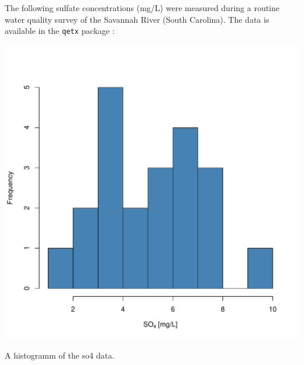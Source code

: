 \documentclass{tufte-book}\usepackage{knitr}
\begin{document}
The following sulfate concentrations (mg/L) were measured during a routine 
water quality survey of the Savannah River (South Carolina). 
The data is available in the \verb|qetx| package :

\begin{knitrout}
\color{fgcolor}\begin{kframe}
\begin{alltt}
\end{alltt}
\end{kframe}
\end{knitrout}



\begin{marginfigure}
\vspace{10mm}
\begin{knitrout}
\color{fgcolor}

{\centering \includegraphics[width=\linewidth]{graphics/so4_hist} 

}



\end{knitrout}

\caption{A histogramm of the so4 data.}
\end{marginfigure}
\end{document}
